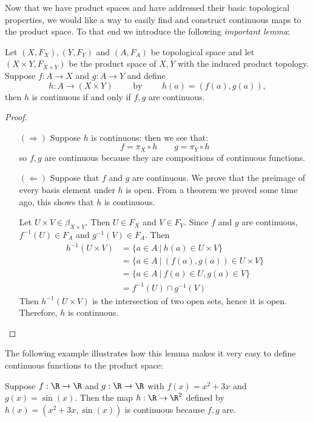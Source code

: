 Now that we have product spaces and have addressed their basic topological properties, we would like a way to easily find and construct continuous maps to the product space. To that end we introduce the following \emph{important lemma}:
\begin{lemma}
Let $(X,F_X),(Y,F_Y)$ and $(A,F_A)$ be topological space and let $(X\times Y,F_{X\times Y})$ be the product space of $X,Y$ with the induced product topology. Suppose $f:A\to X$ and $g:A\to Y$ and define
\[h:A\to(X\times Y) \qquad \text{ by } \qquad h(a) = (f(a),g(a)),\]
then $h$ is continuous if and only if $f,g$ are continuous.
\end{lemma}
\begin{proof}
\begin{itemize}
\item[$(\Rightarrow)$]
Suppose $h$ is continuous: then we see that:
\[f = \pi_X \circ h \qquad g = \pi_Y \circ h\]
so $f,g$ are continuous because they are compositions of continuous functions.
\item[$(\Leftarrow)$] Suppose that $f$ and $g$ are continuous.  We prove that the preimage of every basis element under $h$ is open.  From a theorem we proved some time ago, this shows that $h$ is continuous.

Let $U\times V\in \beta_{X\times Y}$.  Then $U\in F_X$ and $V\in F_Y$.  Since $f$ and $g$ are continuous, $f^{-1}(U)\in F_A$ and $g^{-1}(V)\in F_A$.  Then
\begin{align*}
 h^{-1}(U\times V) &= \{a\in A\ |\ h(a)\in U\times V\}\\
 &= \{a\in A\ |\ (f(a), g(a))\in U\times V\}\\
 &= \{a\in A\ |\ f(a)\in U, g(a)\in V\}\\
 &= f^{-1}(U)\cap g^{-1}(V)
 \end{align*}
 Then $h^{-1}(U\times V)$ is the intersection of two open sets, hence it is open.  Therefore, $h$ is continuous.
\end{itemize}
\end{proof}


The following example illustrates how this lemma makes it very easy to define continuous functions to the product space:
\begin{example}
Suppose $f:\R\to\R$ and $g:\R\to\R$ with $f(x) = x^2+3x$ and $g(x) = \sin(x)$. Then the map $h:\R\to\R^2$ defined by $h(x) = (x^2+3x, \sin(x))$ is continuous because $f,g$ are.
\end{example}



